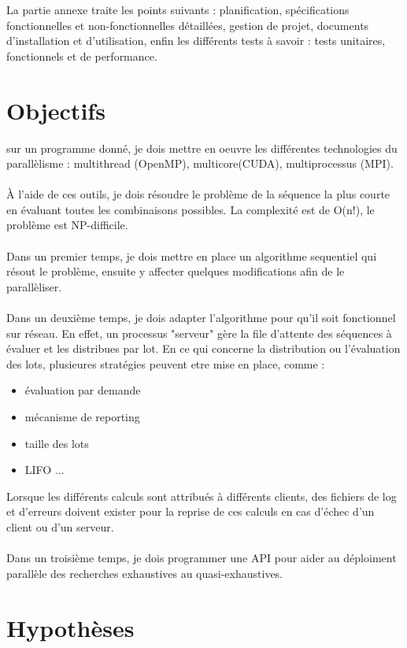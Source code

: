\documentclass{polytech/polytech}
\begin{document}
        La partie annexe traite les points suivants : planification, spécifications fonctionnelles et non-fonctionnelles détaillées, gestion de projet, documents d’installation et d’utilisation, enfin les différents tests à savoir : tests unitaires, fonctionnels et de performance.
        
        \section{Objectifs}
        
        sur un programme donné, je dois mettre en oeuvre les différentes technologies du parallèlisme : multithread (OpenMP), multicore(CUDA), multiprocessus (MPI).\\\\
        À l'aide de ces outils, je dois résoudre le problème de la séquence la plus courte en évaluant toutes les combinaisons possibles. La complexité est de O(n!), le problème est NP-difficile.\\\\
        Dans un premier temps, je dois mettre en place un algorithme sequentiel qui résout le problème, ensuite y affecter quelques modifications afin de le parallèliser.\\\\
        Dans un deuxième temps, je dois adapter l'algorithme pour qu'il soit fonctionnel sur réseau. En effet, un processus "serveur" gère la file d'attente des séquences à évaluer et les distribues par lot. En ce qui concerne la distribution ou l'évaluation des lots, plusieures stratégies peuvent etre mise en place, comme :
        \begin{itemize}
            \item évaluation par demande
            \item mécanisme de reporting
            \item taille des lots
            \item LIFO ...
        \end{itemize}
        Lorsque les différents calculs sont attribués à différents clients, des fichiers de log et d'erreurs doivent exister pour la reprise de ces calculs en cas d'échec d'un client ou d'un serveur.\\\\
        Dans un troisième temps, je dois programmer une API pour aider au déploiment parallèle des recherches exhaustives au quasi-exhaustives.

        \section{Hypothèses}
        
\end{document}
